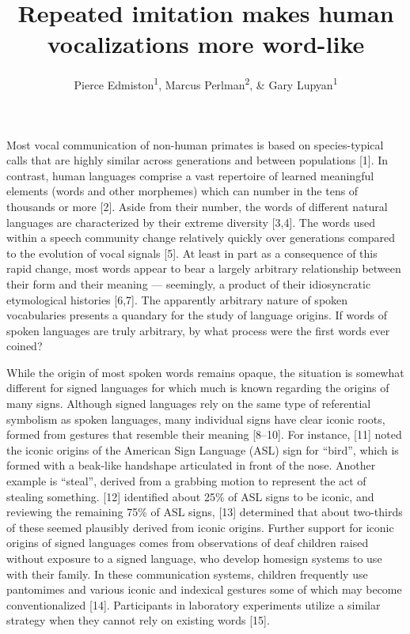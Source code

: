\documentclass[english,floatsintext,man]{apa6}
\title{Repeated imitation makes human vocalizations more word-like}
\author{Pierce Edmiston\textsuperscript{1}, Marcus Perlman\textsuperscript{2}, \& Gary Lupyan\textsuperscript{1}}
\affiliation{
    \vspace{0.5cm}
          \textsuperscript{1} University of Wisconsin-Madison\\
          \textsuperscript{2} University of Birmingham  }
\theoremstyle{definition}
\theoremstyle{definition}
\theoremstyle{definition}
\theoremstyle{remark}
\begin{document}
\maketitle

\setcounter{secnumdepth}{0}



Most vocal communication of non-human primates is based on
species-typical calls that are highly similar across generations and
between populations {[}1{]}. In contrast, human languages comprise a
vast repertoire of learned meaningful elements (words and other
morphemes) which can number in the tens of thousands or more {[}2{]}.
Aside from their number, the words of different natural languages are
characterized by their extreme diversity {[}3,4{]}. The words used
within a speech community change relatively quickly over generations
compared to the evolution of vocal signals {[}5{]}. At least in part as
a consequence of this rapid change, most words appear to bear a largely
arbitrary relationship between their form and their meaning ---
seemingly, a product of their idiosyncratic etymological histories
{[}6,7{]}. The apparently arbitrary nature of spoken vocabularies
presents a quandary for the study of language origins. If words of
spoken languages are truly arbitrary, by what process were the first
words ever coined?

While the origin of most spoken words remains opaque, the situation is
somewhat different for signed languages for which much is known
regarding the origins of many signs. Although signed languages rely on
the same type of referential symbolism as spoken languages, many
individual signs have clear iconic roots, formed from gestures that
resemble their meaning {[}8--10{]}. For instance, {[}11{]} noted the
iconic origins of the American Sign Language (ASL) sign for
\enquote{bird}, which is formed with a beak-like handshape articulated
in front of the nose. Another example is \enquote{steal}, derived from a
grabbing motion to represent the act of stealing something. {[}12{]}
identified about 25\% of ASL signs to be iconic, and reviewing the
remaining 75\% of ASL signs, {[}13{]} determined that about two-thirds
of these seemed plausibly derived from iconic origins. Further support
for iconic origins of signed languages comes from observations of deaf
children raised without exposure to a signed language, who develop
homesign systems to use with their family. In these communication
systems, children frequently use pantomimes and various iconic and
indexical gestures some of which may become conventionalized {[}14{]}.
Participants in laboratory experiments utilize a similar strategy when
they cannot rely on existing words {[}15{]}.
\end{document}
